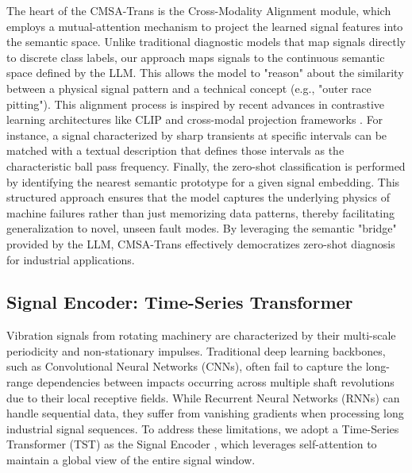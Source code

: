 The heart of the CMSA-Trans is the Cross-Modality Alignment module, which employs a mutual-attention mechanism to project the learned signal features into the semantic space. Unlike traditional diagnostic models that map signals directly to discrete class labels, our approach maps signals to the continuous semantic space defined by the LLM. This allows the model to "reason" about the similarity between a physical signal pattern and a technical concept (e.g., "outer race pitting"). This alignment process is inspired by recent advances in contrastive learning architectures like CLIP \cite{radford2021learning} and cross-modal projection frameworks \cite{oord2018representation, chen2020simple}. For instance, a signal characterized by sharp transients at specific intervals can be matched with a textual description that defines those intervals as the characteristic ball pass frequency. Finally, the zero-shot classification is performed by identifying the nearest semantic prototype for a given signal embedding. This structured approach ensures that the model captures the underlying physics of machine failures rather than just memorizing data patterns, thereby facilitating generalization to novel, unseen fault modes. By leveraging the semantic "bridge" provided by the LLM, CMSA-Trans effectively democratizes zero-shot diagnosis for industrial applications.

\subsection{Signal Encoder: Time-Series Transformer}
Vibration signals from rotating machinery are characterized by their multi-scale periodicity and non-stationary impulses. Traditional deep learning backbones, such as Convolutional Neural Networks (CNNs), often fail to capture the long-range dependencies between impacts occurring across multiple shaft revolutions due to their local receptive fields. While Recurrent Neural Networks (RNNs) can handle sequential data, they suffer from vanishing gradients when processing long industrial signal sequences. To address these limitations, we adopt a Time-Series Transformer (TST) as the Signal Encoder \cite{zerveas2021transformer}, which leverages self-attention to maintain a global view of the entire signal window.

